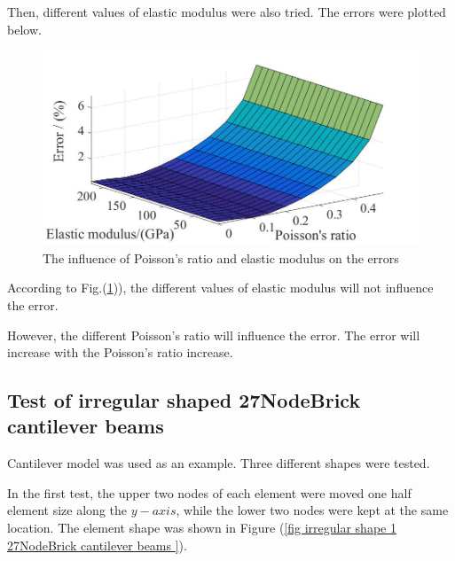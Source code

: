 \documentclass[fleqn,11pt]{article}
\begin{document}
\newpage
Then, different values of elastic modulus were also tried. The errors were plotted below.
\begin{figure}[H]
  \centering
  \includegraphics[width=13cm]{../Figure-files/3D_error.jpg}
  \caption{The influence of Poisson's ratio and elastic modulus on the errors} 
  \label{fig The influence of Poisson's ratio and elastic modulus on the errors}
\end{figure}


According to Fig.(\ref{fig The influence of Poisson's ratio and elastic modulus on the errors})), the different values of elastic modulus will not influence the error. 

However, the different Poisson's ratio will influence the error. The error will increase with the Poisson's ratio increase. 





\newpage
\subsection{Test of irregular shaped 27NodeBrick cantilever beams}

Cantilever model was used as an example. 
Three different shapes were tested. 


In the first test, the upper two nodes of each element were moved one half element size along the $y-axis$, while the lower two nodes were kept at the same location.  The element shape was shown in Figure (\ref{fig irregular shape 1 27NodeBrick cantilever beams }).
\end{document}
